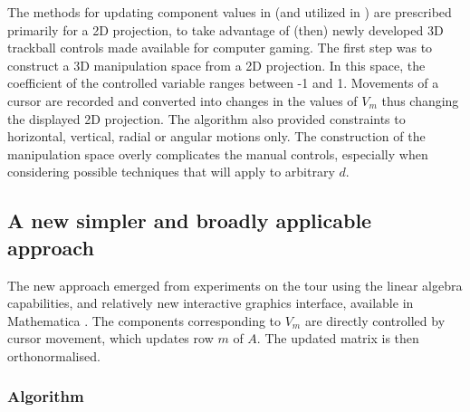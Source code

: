 \documentclass[]{interact}
\theoremstyle{plain}%
\theoremstyle{definition}
\theoremstyle{remark}
\begin{document}
The methods for updating component values in \citet{cook_manual_1997}
(and utilized in \citet{spyrison_spinifex_2020}) are prescribed
primarily for a 2D projection, to take advantage of (then) newly
developed 3D trackball controls made available for computer gaming. The
first step was to construct a 3D manipulation space from a 2D
projection. In this space, the coefficient of the controlled variable
ranges between -1 and 1. Movements of a cursor are recorded and
converted into changes in the values of \(V_m\) thus changing the
displayed 2D projection. The algorithm also provided constraints to
horizontal, vertical, radial or angular motions only. The construction
of the manipulation space overly complicates the manual controls,
especially when considering possible techniques that will apply to
arbitrary \(d\).

\hypertarget{a-new-simpler-and-broadly-applicable-approach}{%
\subsection{A new simpler and broadly applicable
approach}\label{a-new-simpler-and-broadly-applicable-approach}}

The new approach emerged from experiments on the tour using the linear
algebra capabilities, and relatively new interactive graphics interface,
available in Mathematica \citep{Mathematica}. The components
corresponding to \(V_m\) are directly controlled by cursor movement,
which updates row \(m\) of \(A\). The updated matrix is then
orthonormalised.

\hypertarget{algorithm}{%
\subsubsection{Algorithm}\label{algorithm}}
\end{document}
